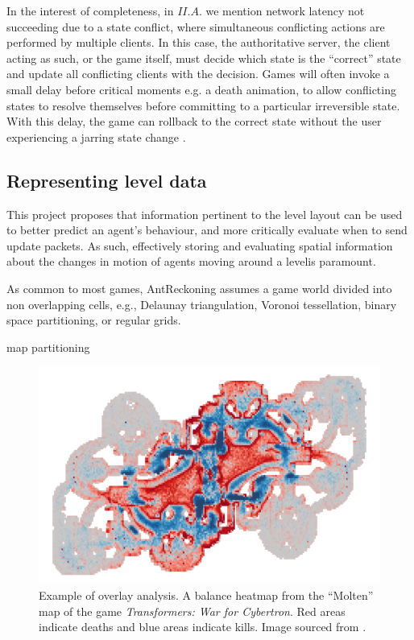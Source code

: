 \documentclass[journal]{IEEEtran}
\begin{document}
In the interest of completeness, in $II.A.$ we mention network latency not succeeding due to a state conflict, where simultaneous conflicting actions are performed by multiple clients. In this case, the authoritative server, the client acting as such, or the game itself, must decide which state is the ``correct'' state and update all conflicting clients with the decision. Games will often invoke a small delay before critical moments e.g. a death animation, to allow conflicting states to resolve themselves before committing to a particular irreversible state. With this delay, the game can rollback to the correct state without the user experiencing a jarring state change \cite{mauve2000keep}.

\subsection{Representing level data}

This project proposes that information pertinent to the level layout can be used to better predict an agent's behaviour, and more critically evaluate when to send update packets. As such, effectively storing and evaluating spatial information about the changes in motion of agents moving around a levelis paramount. 

As common to most games, AntReckoning assumes
a game world divided into non overlapping cells,
e.g., Delaunay triangulation, Voronoi tessellation, binary space
partitioning, or regular grids.

\cite{bauckhage2014beyond}

\cite{kuipers1978modeling}

\cite{wilkinson2009history}

\cite{moumtzidou2013discovery}

\cite{drachen2013spatial}

map partitioning \cite{steed2003partitioning}

\begin{figure}[h]
    \centering
    \includegraphics[width=0.9\linewidth]{Heatmap1.png}
    \caption{Example of overlay analysis. A balance heatmap from the ``Molten'' map of the game \textit{Transformers: War for Cybertron}. Red areas indicate deaths and blue areas indicate kills. Image sourced from \cite{drachen2013spatial}.}
    \label{fig:hm1}
\end{figure}
\end{document}
